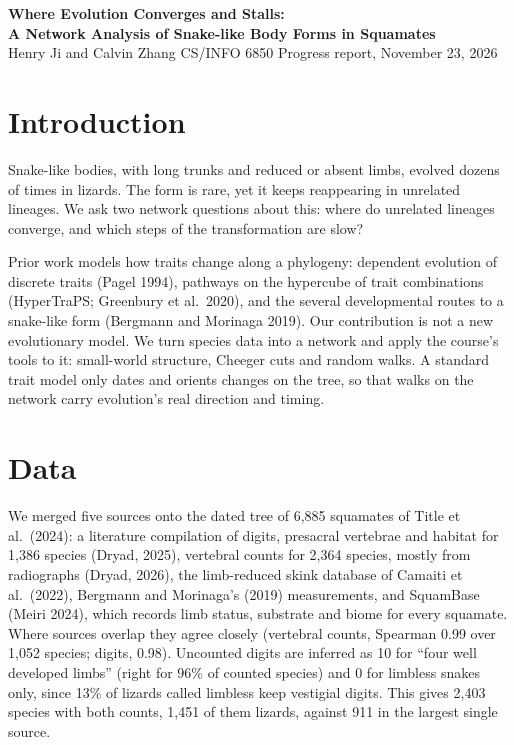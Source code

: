 \documentclass[11pt]{article}
\begin{document}
\vspace*{-18pt}
\begin{center}
{\large\bfseries Where Evolution Converges and Stalls:\\ A Network Analysis of Snake-like Body Forms in Squamates}\\[4pt]
Henry Ji and Calvin Zhang \quad CS/INFO 6850 \quad Progress report, November 23, 2026
\end{center}

\section{Introduction}

Snake-like bodies, with long trunks and reduced or absent limbs, evolved dozens of times in lizards. The form is rare, yet it keeps reappearing in unrelated lineages. We ask two network questions about this: where do unrelated lineages converge, and which steps of the transformation are slow?

Prior work models how traits change along a phylogeny: dependent evolution of discrete traits (Pagel 1994), pathways on the hypercube of trait combinations (HyperTraPS; Greenbury et al.\ 2020), and the several developmental routes to a snake-like form (Bergmann and Morinaga 2019). Our contribution is not a new evolutionary model. We turn species data into a network and apply the course's tools to it: small-world structure, Cheeger cuts and random walks. A standard trait model only dates and orients changes on the tree, so that walks on the network carry evolution's real direction and timing.

\section{Data}

We merged five sources onto the dated tree of 6,885 squamates of Title et al.\ (2024): a literature compilation of digits, presacral vertebrae and habitat for 1,386 species (Dryad, 2025), vertebral counts for 2,364 species, mostly from radiographs (Dryad, 2026), the limb-reduced skink database of Camaiti et al.\ (2022), Bergmann and Morinaga's (2019) measurements, and SquamBase (Meiri 2024), which records limb status, substrate and biome for every squamate. Where sources overlap they agree closely (vertebral counts, Spearman 0.99 over 1,052 species; digits, 0.98). Uncounted digits are inferred as 10 for ``four well developed limbs'' (right for 96\% of counted species) and 0 for limbless snakes only, since 13\% of lizards called limbless keep vestigial digits. This gives 2,403 species with both counts, 1,451 of them lizards, against 911 in the largest single source.
\end{document}
